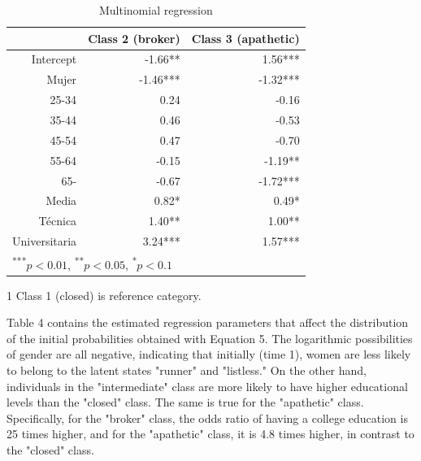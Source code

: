 \begin{table}[htp]
\centering
\begin{threeparttable}
\caption{\label{demo-table} Multinomial regression}
\begin{tabular}{rrr}
  \hline
 & Class 2 (broker) & Class 3 (apathetic)\\ 
  \hline
Intercept & -1.66** & 1.56*** \\ 
  Mujer & -1.46*** & -1.32*** \\ 
  25-34 & 0.24 & -0.16 \\ 
  35-44 & 0.46 & -0.53 \\ 
  45-54 & 0.47 & -0.70 \\ 
  55-64 & -0.15 & -1.19** \\ 
  65- & -0.67 & -1.72*** \\ 
  Media & 0.82* & 0.49* \\ 
  Técnica & 1.40** & 1.00** \\ 
  Universitaria & 3.24*** & 1.57*** \\ 
   \hline
\multicolumn{3}{l}{\textsuperscript{***}$p<0.01$, 
  \textsuperscript{**}$p<0.05$, 
  \textsuperscript{*}$p<0.1$}
\end{tabular}
\begin{tablenotes}
    \item[1] Class 1 (closed) is reference category.
  \end{tablenotes}
\end{threeparttable}
\end{table}

Table 4 contains the estimated regression parameters that affect the distribution of the initial probabilities obtained with Equation 5. The logarithmic possibilities of gender are all negative, indicating that initially (time 1), women are less likely to belong to the latent states "runner" and "listless." On the other hand, individuals in the "intermediate" class are more likely to have higher educational levels than the "closed" class. The same is true for the "apathetic" class. Specifically, for the "broker" class, the odds ratio of having a college education is 25 times higher, and for the "apathetic" class, it is 4.8 times higher, in contrast to the "closed" class.


